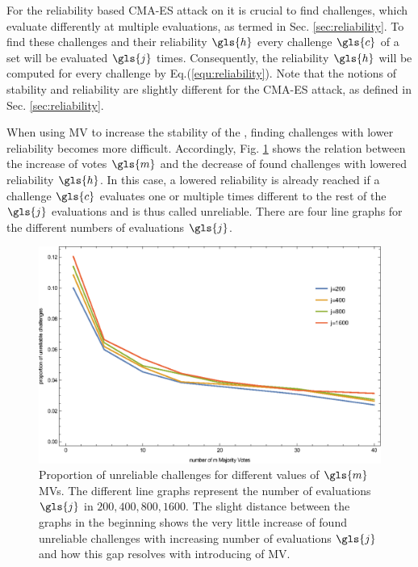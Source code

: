 For the reliability based \ac{CMA-ES} attack on \apufs it is crucial to find challenges, which evaluate differently at multiple evaluations, as termed in Sec. \ref{sec:reliability}.
To find these challenges and their reliability $\gls{h}$ every challenge $\gls{c}$ of a set will be evaluated $\gls{j}$ times.
Consequently, the reliability $\gls{h}$ will be computed for every challenge by Eq.(\ref{equ:reliability}).
Note that the notions of stability and reliability are slightly different for the \ac{CMA-ES} attack, as defined in Sec. \ref{sec:reliability}.

When using \ac{MV} to increase the stability of the \apuf, finding challenges with lower reliability becomes more difficult.
Accordingly, Fig. \ref{fig:cmamajorityvotemeasurementrelation} shows the relation between the increase of votes $\gls{m}$ and the decrease of found challenges with lowered reliability $\gls{h}$.
In this case, a lowered reliability is already reached if a challenge $\gls{c}$ evaluates one or multiple times different to the rest of the $\gls{j}$ evaluations and is thus called unreliable.
There are four line graphs for the different numbers of evaluations $\gls{j}$.

\begin{figure}[ht]
\includegraphics[width=1.00\textwidth]{images/mv-measurements-unstableChallenges.eps}
\caption[Proportion of unreliable challenges]{Proportion of unreliable challenges for different values of $\gls{m}$ \acp{MV}. The different line graphs represent the number of evaluations $\gls{j}$ in $200, 400, 800, 1600$. The slight distance between the graphs in the beginning shows the very little increase of found unreliable challenges with increasing number of evaluations $\gls{j}$ and how this gap resolves with introducing of \ac{MV}.}
\label{fig:cmamajorityvotemeasurementrelation}
\end{figure}

